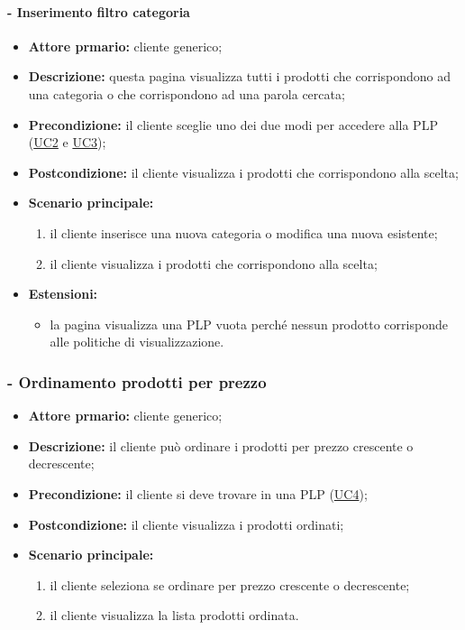 \paragraph{ - Inserimento filtro categoria}
\begin{itemize}
    \item \textbf{Attore prmario:} cliente generico;
    \item \textbf{Descrizione:} questa pagina visualizza tutti i prodotti che corrispondono ad una categoria o che corrispondono ad una parola cercata;
    \item \textbf{Precondizione:} il cliente sceglie uno dei due modi per accedere alla PLP (\hyperref[UC2]{UC2} e \hyperref[UC3]{UC3});
    \item \textbf{Postcondizione:} il cliente visualizza i prodotti che corrispondono alla scelta;
    \item \textbf{Scenario principale:}
          \begin{enumerate}
              \item il cliente inserisce una nuova categoria o modifica una nuova esistente;
              \item il cliente visualizza i prodotti che corrispondono alla scelta;
          \end{enumerate}
    \item \textbf{Estensioni:}
          \begin{itemize}
              \item la pagina visualizza una PLP vuota perché nessun prodotto corrisponde alle politiche di visualizzazione.
          \end{itemize}
\end{itemize}

\stepsubUserCase
\subsubsection{ - Ordinamento prodotti per prezzo}
\begin{itemize}
    \item \textbf{Attore prmario:} cliente generico;
    \item \textbf{Descrizione:} il cliente può ordinare i prodotti per prezzo crescente o decrescente;
    \item \textbf{Precondizione:} il cliente si deve trovare in una PLP (\hyperref[UC4]{UC4});
    \item \textbf{Postcondizione:} il cliente visualizza i prodotti ordinati;
    \item \textbf{Scenario principale:}
          \begin{enumerate}
              \item il cliente seleziona se ordinare per prezzo crescente o decrescente;
              \item il cliente visualizza la lista prodotti ordinata.
          \end{enumerate}
\end{itemize}


